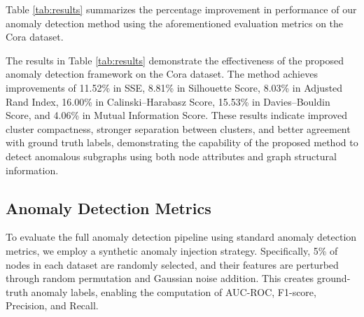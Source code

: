 \documentclass[10pt,twocolumn,a4paper]{article}
\begin{document}
 Table \ref{tab:results} summarizes the percentage improvement in performance of our anomaly detection method using the aforementioned evaluation metrics on the Cora dataset.

\begin{table}[!ht]
  \centering
  \caption{Performance of Anomaly Detection Method on Cora Dataset}
  \label{tab:results}
\end{table}


 The results in Table \ref{tab:results} demonstrate the effectiveness of the proposed anomaly detection framework on the Cora dataset. The method achieves improvements of 11.52\% in SSE, 8.81\% in Silhouette Score, 8.03\% in Adjusted Rand Index, 16.00\% in Calinski--Harabasz Score, 15.53\% in Davies--Bouldin Score, and 4.06\% in Mutual Information Score. These results indicate improved cluster compactness, stronger separation between clusters, and better agreement with ground truth labels, demonstrating the capability of the proposed method to detect anomalous subgraphs using both node attributes and graph structural information.

\subsection{Anomaly Detection Metrics}

To evaluate the full anomaly detection pipeline using standard anomaly detection metrics, we employ a synthetic anomaly injection strategy. Specifically, 5\% of nodes in each dataset are randomly selected, and their features are perturbed through random permutation and Gaussian noise addition. This creates ground-truth anomaly labels, enabling the computation of AUC-ROC, F1-score, Precision, and Recall.
\end{document}
